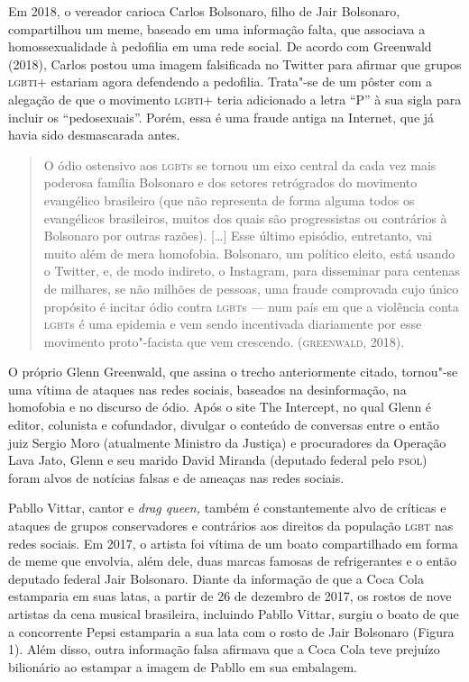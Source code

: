 Em 2018, o vereador carioca Carlos Bolsonaro, filho de Jair Bolsonaro,
compartilhou um meme, baseado em uma informação falta, que associava a
homossexualidade à pedofilia em uma rede social. De acordo com Greenwald
(2018), Carlos postou uma imagem falsificada no Twitter para afirmar que
grupos \textsc{lgbti}+ estariam agora defendendo a pedofilia. Trata"-se de um
pôster com a alegação de que o movimento \textsc{lgbti}+ teria adicionado a letra
``P'' à sua sigla para incluir os ``pedosexuais''. Porém, essa é uma
fraude antiga na Internet, que já havia sido desmascarada antes.

\begin{quote}
O ódio ostensivo aos \textsc{lgbt}s se tornou um eixo central da cada vez mais
poderosa família Bolsonaro e dos setores retrógrados do movimento
evangélico brasileiro (que não representa de forma alguma todos os
evangélicos brasileiros, muitos dos quais são progressistas ou
contrários à Bolsonaro por outras razões). {[}\ldots{}{]} Esse último
episódio, entretanto, vai muito além de mera homofobia. Bolsonaro, um
político eleito, está usando o Twitter, e, de modo indireto, o
Instagram, para disseminar para centenas de milhares, se não milhões de
pessoas, uma fraude comprovada cujo único propósito é incitar ódio
contra \textsc{lgbt}s --- num país em que a violência conta \textsc{lgbt}s é uma epidemia e
vem sendo incentivada diariamente por esse movimento proto"-facista que
vem crescendo. (\textsc{greenwald}, 2018).
\end{quote}

O próprio Glenn Greenwald, que assina o trecho anteriormente citado,
tornou"-se uma vítima de ataques nas redes sociais, baseados na
desinformação, na homofobia e no discurso de ódio. Após o site The
Intercept, no qual Glenn é editor, colunista e cofundador, divulgar o
conteúdo de conversas entre o então juiz Sergio Moro (atualmente
Ministro da Justiça) e procuradores da Operação Lava Jato, Glenn e seu
marido David Miranda (deputado federal pelo \textsc{psol}) foram alvos de
notícias falsas e de ameaças nas redes sociais.

Pabllo Vittar, cantor e \emph{drag queen,} também é constantemente alvo
de críticas e ataques de grupos conservadores e contrários aos direitos
da população \textsc{lgbt} nas redes sociais. Em 2017, o artista foi vítima de um
boato compartilhado em forma de meme que envolvia, além dele, duas
marcas famosas de refrigerantes e o então deputado federal Jair
Bolsonaro. Diante da informação de que a Coca Cola estamparia em suas
latas, a partir de 26 de dezembro de 2017, os rostos de nove artistas da
cena musical brasileira, incluindo Pabllo Vittar, surgiu o boato de que
a concorrente Pepsi estamparia a sua lata com o rosto de Jair Bolsonaro
(Figura 1). Além disso, outra informação falsa afirmava que a Coca Cola
teve prejuízo bilionário ao estampar a imagem de Pabllo em sua
embalagem.

